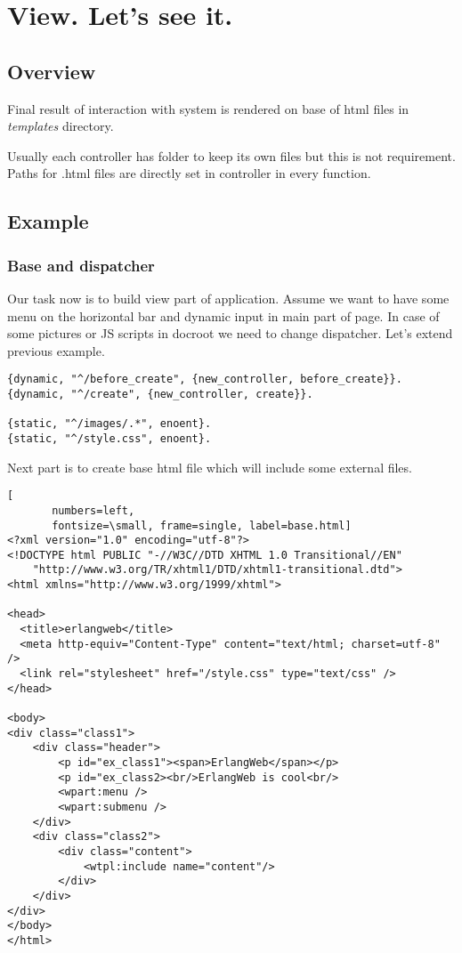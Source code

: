 \section{View. Let's see it.}\label{view}
\subsection{Overview}
Final result of interaction with system is rendered on base of html files in
{\it templates} directory. 

Usually each controller has folder to keep its own files but this is not
requirement. Paths for .html files are directly set in controller in every
function.

\subsection{Example}
\subsubsection{Base and dispatcher}
Our task now is to build view part of application. Assume we want to have some
menu on the horizontal bar and dynamic input in main part of page. In case of
some pictures or JS scripts in docroot we need to change dispatcher. 
Let's extend previous example.\\
\begin{Verbatim}[frame=single,
       framesep=2mm,
       label=dispacher.conf,labelposition=topline,
       fontsize=\small]
{dynamic, "^/before_create", {new_controller, before_create}}.
{dynamic, "^/create", {new_controller, create}}.

{static, "^/images/.*", enoent}.
{static, "^/style.css", enoent}.
\end{Verbatim}

Next part is to create base html file which will include some external files.

\begin{Verbatim}[  
       numbers=left,
       fontsize=\small, frame=single, label=base.html]
<?xml version="1.0" encoding="utf-8"?>
<!DOCTYPE html PUBLIC "-//W3C//DTD XHTML 1.0 Transitional//EN"
    "http://www.w3.org/TR/xhtml1/DTD/xhtml1-transitional.dtd">
<html xmlns="http://www.w3.org/1999/xhtml">

<head>
  <title>erlangweb</title> 
  <meta http-equiv="Content-Type" content="text/html; charset=utf-8" />
  <link rel="stylesheet" href="/style.css" type="text/css" />
</head>

<body>
<div class="class1">
	<div class="header">
		<p id="ex_class1"><span>ErlangWeb</span></p>
		<p id="ex_class2><br/>ErlangWeb is cool<br/>
		<wpart:menu />
		<wpart:submenu />
	</div>
	<div class="class2">
  		<div class="content">
			<wtpl:include name="content"/>
		</div>
	</div>
</div>
</body>
</html>
\end{Verbatim}

